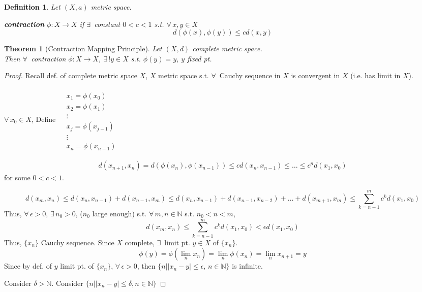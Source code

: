 \documentclass[10pt]{amsart}
\newtheorem{theorem}{Theorem}
\newtheorem{definition}{Definition}
\begin{document}
\begin{multicols*}{2}
\begin{definition}
  Let $(X,a)$ metric space.  

\textbf{contraction} $\phi:X \to X$ if $\exists \, $ constant $0<c<1$ s.t. $\forall \, x,y \in X$
\[
d(\phi(x),\phi(y)) \leq cd(x,y)
\]
\end{definition}

\begin{theorem}[Contraction Mapping Principle]
  Let $(X,d)$ complete metric space.  \\
Then $\forall \, $ contraction $\phi:X\to X$, $\exists \, ! y\in X$ s.t. $\phi(y) = y$, $y$ \emph{fixed pt.}
\end{theorem}

\begin{proof}
  Recall def. of complete metric space $X$, $X$ metric space s.t. $\forall \, $ Cauchy sequence in $X$ is convergent in $X$ (i.e. has limit in $X$).  

$\forall \, x_0 \in X$,
Define $\begin{aligned} & \quad \\
  & x_1 = \phi(x_0) \\ 
  & x_2 = \phi(x_1) \\ 
  & \vdots \\
  & x_j = \phi(x_{j-1}) \\ 
  & \vdots \\
  & x_n = \phi(x_{n-1})
\end{aligned}$

\[
\begin{gathered}
  d(x_{n+1},x_n) = d(\phi(x_n),\phi(x_{n-1})) \leq c d(x_n,x_{n-1}) \leq \dots \leq c^nd(x_1,x_0)
\end{gathered}
\]
for some $0< c<1$.

\[
d(x_m,x_n) \leq d(x_n,x_{n-1}) + d(x_{n-1},x_m) \leq d(x_n,x_{n-1}) + d(x_{n-1},x_{n-2}) + \dots + d(x_{m+1},x_m) \leq \sum_{k=n-1}^m c^k d(x_1,x_0)
\]
Thus, $\forall \, \epsilon >0$, $\exists \, n_0 >0$, ($n_0$ large enough) s.t. $\forall \, m ,n\in \mathbb{N}$ s.t. $n_0 < n <m$, 
\[
d(x_m,x_n) \leq \sum_{k=n-1}^m c^k d(x_1,x_0) < \epsilon d(x_1,x_0)
\]
Thus, $\lbrace x_n \rbrace$ Cauchy sequence.  Since $X$ complete, $\exists \, $ limit pt. $y \in X$ of $\lbrace x_n \rbrace$.  
\[
\phi(y) = \phi(\lim_n x_n) = \lim_n \phi(x_n) = \lim_n x_{n+1} = y
\]
Since by def. of $y$ limit pt. of $\lbrace x_n \rbrace$, $\forall \, \epsilon >0$, then $\lbrace n | |x_n -y|\leq \epsilon, \, n \in \mathbb{N}\rbrace$ is infinite.  

Consider $\delta > \mathbb{N}$.  Consider $\lbrace n | |x_n-y| \leq \delta, n \in \mathbb{N}\rbrace$ 


\end{proof}
\end{multicols*}
\end{document}
